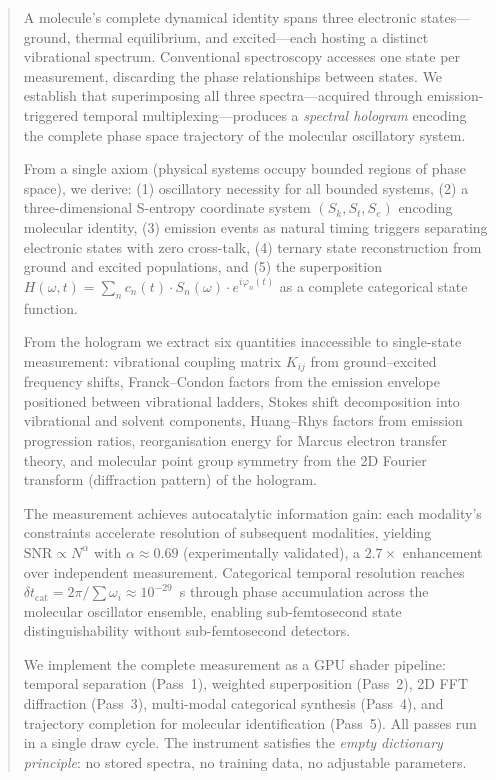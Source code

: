 \documentclass[11pt,twocolumn,a4paper]{article}
\theoremstyle{definition}
\theoremstyle{remark}
\newcommand{\Sk}{S_k}
\newcommand{\St}{S_t}
\newcommand{\Se}{S_e}
\begin{document}
\begin{abstract}
\noindent A molecule's complete dynamical identity spans three electronic states---ground, thermal equilibrium, and excited---each hosting a distinct vibrational spectrum. Conventional spectroscopy accesses one state per measurement, discarding the phase relationships between states. We establish that superimposing all three spectra---acquired through emission-triggered temporal multiplexing---produces a \emph{spectral hologram} encoding the complete phase space trajectory of the molecular oscillatory system.

From a single axiom (physical systems occupy bounded regions of phase space), we derive: (1) oscillatory necessity for all bounded systems, (2) a three-dimensional S-entropy coordinate system $(\Sk, \St, \Se)$ encoding molecular identity, (3) emission events as natural timing triggers separating electronic states with zero cross-talk, (4) ternary state reconstruction from ground and excited populations, and (5) the superposition $H(\omega,t) = \sum_n c_n(t) \cdot S_n(\omega) \cdot e^{i\varphi_n(t)}$ as a complete categorical state function.

From the hologram we extract six quantities inaccessible to single-state measurement: vibrational coupling matrix $K_{ij}$ from ground--excited frequency shifts, Franck--Condon factors from the emission envelope positioned between vibrational ladders, Stokes shift decomposition into vibrational and solvent components, Huang--Rhys factors from emission progression ratios, reorganisation energy for Marcus electron transfer theory, and molecular point group symmetry from the 2D Fourier transform (diffraction pattern) of the hologram.

The measurement achieves autocatalytic information gain: each modality's constraints accelerate resolution of subsequent modalities, yielding $\mathrm{SNR} \propto N^{\alpha}$ with $\alpha \approx 0.69$ (experimentally validated), a $2.7\times$ enhancement over independent measurement. Categorical temporal resolution reaches $\delta t_{\mathrm{cat}} = 2\pi / \sum \omega_i \approx 10^{-29}$~s through phase accumulation across the molecular oscillator ensemble, enabling sub-femtosecond state distinguishability without sub-femtosecond detectors.

We implement the complete measurement as a GPU shader pipeline: temporal separation (Pass~1), weighted superposition (Pass~2), 2D FFT diffraction (Pass~3), multi-modal categorical synthesis (Pass~4), and trajectory completion for molecular identification (Pass~5). All passes run in a single draw cycle. The instrument satisfies the \emph{empty dictionary principle}: no stored spectra, no training data, no adjustable parameters.


\end{abstract}
\end{document}
